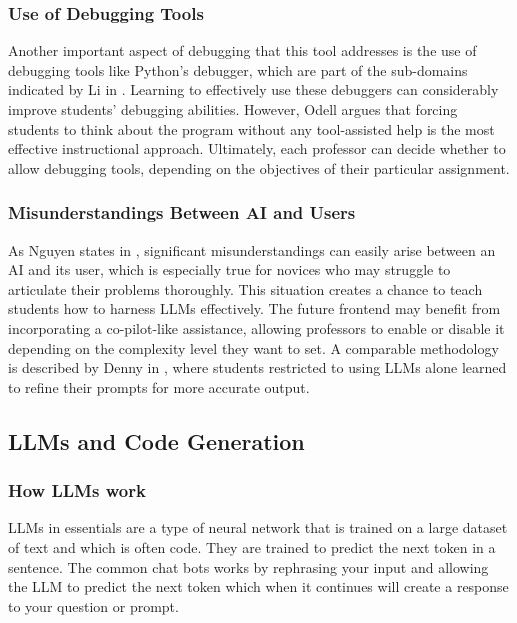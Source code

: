 \documentclass[12pt]{extarticle}
\begin{document}
\subsubsection{Use of Debugging Tools}

Another important aspect of debugging that this tool addresses is the use of debugging tools like Python’s debugger, which are part of the sub-domains indicated by Li in \cite{li2019}. Learning to effectively use these debuggers can considerably improve students’ debugging abilities. However, Odell \cite{odell2017} argues that forcing students to think about the program without any tool-assisted help is the most effective instructional approach. Ultimately, each professor can decide whether to allow debugging tools, depending on the objectives of their particular assignment.

\subsubsection{Misunderstandings Between AI and Users}

As Nguyen states in \cite{nguyen2024}, significant misunderstandings can easily arise between an AI and its user, which is especially true for novices who may struggle to articulate their problems thoroughly. This situation creates a chance to teach students how to harness LLMs effectively. The future frontend may benefit from incorporating a co-pilot-like assistance, allowing professors to enable or disable it depending on the complexity level they want to set. A comparable methodology is described by Denny in \cite{denny2023}, where students restricted to using LLMs alone learned to refine their prompts for more accurate output.

\subsection{LLMs and Code Generation}
\subsubsection{How LLMs work}

LLMs in essentials are a type of neural network that is trained on a large dataset of text and which is often code. They are trained to predict the next token in a sentence. The common chat bots works by rephrasing your input and allowing the LLM to predict the next token which when it continues will create a response to your question or prompt.
\end{document}
